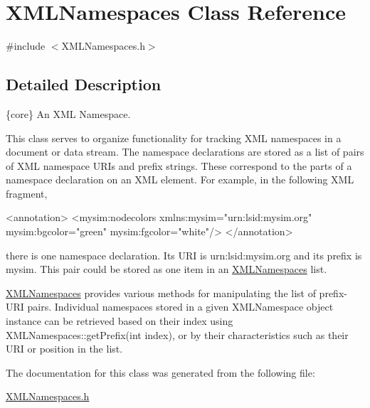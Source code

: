 \hypertarget{class_x_m_l_namespaces}{}\section{X\+M\+L\+Namespaces Class Reference}
\label{class_x_m_l_namespaces}


{\ttfamily \#include $<$X\+M\+L\+Namespaces.\+h$>$}



\subsection{Detailed Description}
\{core\} An X\+ML Namespace.



This class serves to organize functionality for tracking X\+ML namespaces in a document or data stream. The namespace declarations are stored as a list of pairs of X\+ML namespace U\+R\+Is and prefix strings. These correspond to the parts of a namespace declaration on an X\+ML element. For example, in the following X\+ML fragment, \begin{DoxyVerb}<annotation>
    <mysim:nodecolors xmlns:mysim="urn:lsid:mysim.org"
         mysim:bgcolor="green" mysim:fgcolor="white"/>
</annotation>
\end{DoxyVerb}
 there is one namespace declaration. Its U\+RI is {\ttfamily urn\+:lsid\+:mysim.\+org} and its prefix is {\ttfamily mysim}. This pair could be stored as one item in an \hyperlink{class_x_m_l_namespaces}{X\+M\+L\+Namespaces} list.

\hyperlink{class_x_m_l_namespaces}{X\+M\+L\+Namespaces} provides various methods for manipulating the list of prefix-\/\+U\+RI pairs. Individual namespaces stored in a given X\+M\+L\+Namespace object instance can be retrieved based on their index using X\+M\+L\+Namespaces\+::get\+Prefix(int index), or by their characteristics such as their U\+RI or position in the list. 

The documentation for this class was generated from the following file\+:\begin{DoxyCompactItemize}
\item 
\hyperlink{_x_m_l_namespaces_8h}{X\+M\+L\+Namespaces.\+h}\end{DoxyCompactItemize}
